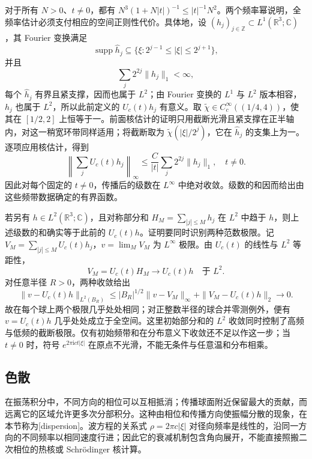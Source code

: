 对于所有 \(N>0\)、\(t\ne0\)，都有 \(N^3(1+N|t|)^{-1}\leq |t|^{-1}N^2\)。两个频率幂说明，全频率估计必须支付相应的空间正则性代价。具体地，设 \((h_j)_{j\in\mathbb Z}\subset L^1(\mathbb R^3;\mathbb C)\)，其 Fourier 变换满足
\[
 \operatorname{supp}\widehat h_j\subseteq
 \{\xi:2^{j-1}\leq|\xi|\leq2^{j+1}\},
\]
并且
\[
 \sum_j2^{2j}\|h_j\|_1<\infty,
\]
每个 \(\widehat h_j\) 有界且紧支撑，因而也属于 \(L^2\)；由 Fourier 变换的 \(L^1\) 与 \(L^2\) 版本相容，\(h_j\) 也属于 \(L^2\)，所以此前定义的 \(U_c(t)h_j\) 有意义。取 \(\widetilde\chi\in C_c^\infty((1/4,4))\)，使其在 \([1/2,2]\) 上恒等于一。前面核估计的证明只用截断光滑且紧支撑在正半轴内，对这一稍宽环带同样适用；将截断取为 \(\widetilde\chi(|\xi|/2^j)\)，它在 \(\widehat h_j\) 的支集上为一。逐项应用核估计，得到
\[
 \left\|\sum_jU_c(t)h_j\right\|_\infty
 \leq\dfrac C{|t|}\sum_j2^{2j}\|h_j\|_1,\quad t\ne0.
\]
因此对每个固定的 \(t\ne0\)，传播后的级数在 \(L^\infty\) 中绝对收敛。级数的和因而给出由这些频带数据确定的有界函数。

\ProseParagraphBreak

若另有 \(h\in L^2(\mathbb R^3;\mathbb C)\)，且对称部分和 \(H_M=\sum_{|j|\leq M}h_j\) 在 \(L^2\) 中趋于 \(h\)，则上述级数的和确实等于此前的 \(U_c(t)h\)。证明要同时识别两种范数极限。记 \(V_M=\sum_{|j|\leq M}U_c(t)h_j\)，\(v=\lim_M V_M\) 为 \(L^\infty\) 极限。由 \(U_c(t)\) 的线性与 \(L^2\) 等距性，
\[
 V_M=U_c(t)H_M\longrightarrow U_c(t)h\quad\text{于 }L^2.
\]
对任意半径 \(R>0\)，两种收敛给出
\[
 \|v-U_c(t)h\|_{L^2(B_R)}
 \leq |B_R|^{1/2}\|v-V_M\|_\infty
       +\|V_M-U_c(t)h\|_2\longrightarrow0.
\]
故在每个球上两个极限几乎处处相同；对正整数半径的球合并零测例外，便有 \(v=U_c(t)h\) 几乎处处成立于全空间。这里初始部分和的 \(L^2\) 收敛同时控制了高频与低频的截断极限。仅有初始频带和在分布意义下收敛还不足以作这一步；当 \(t\ne0\) 时，符号 \(e^{2\pi\mathrm{i}ct|\xi|}\) 在原点不光滑，不能无条件与任意温和分布相乘。

\subsection{色散}
\label{b2:subsec:110402}

在振荡积分中，不同方向的相位可以互相抵消；传播球面附近保留最大的贡献，而远离它的区域允许更多次分部积分。这种由相位和传播方向使振幅分散的现象，在本节称为[dispersion]。波方程的关系式 \(\rho=2\pi c|\xi|\) 对径向频率是线性的，沿同一方向的不同频率以相同速度行进；因此它的衰减机制包含角向展开，不能直接照搬二次相位的热核或 Schrödinger 核计算。

\ProseParagraphBreak

